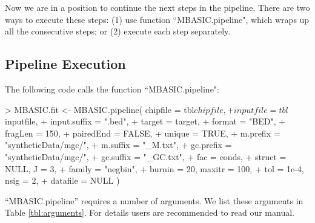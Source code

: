 \documentclass[a4paper,10pt]{article}
\begin{document}
Now we are in a position to continue the next steps in the pipeline. There are two ways to execute these steps: (1) use function ``MBASIC.pipeline", which wraps up all the consecutive steps; or (2) execute each step separately.

\subsection{Pipeline Execution}

The following code calls the function ``MBASIC.pipeline":

\begin{Schunk}
\begin{Sinput}
> MBASIC.fit <- MBASIC.pipeline( chipfile = tbl$chipfile,
+                                 inputfile = tbl$inputfile, 
+                                 input.suffix = ".bed", 
+                                 target = target, 
+                                 format = "BED", 
+                                 fragLen = 150, 
+                                 pairedEnd = FALSE, 
+                                 unique = TRUE, 
+                                 m.prefix = "syntheticData/mgc/", 
+                                 m.suffix = "_M.txt", 
+                                 gc.prefix = "syntheticData/mgc/", 
+                                 gc.suffix = "_GC.txt", 
+                                 fac = conds,
+                                 struct = NULL, J = 3, 
+                                 family = "negbin", 
+                                 burnin = 20, maxitr = 100, 
+                                 tol = 1e-4, nsig = 2, 
+                                 datafile = NULL )
\end{Sinput}
\end{Schunk}

``MBASIC.pipeline'' requires a number of arguments. We list these arguments in Table \ref{tbl:arguments}. For details users are recommended to read our manual.
\end{document}
